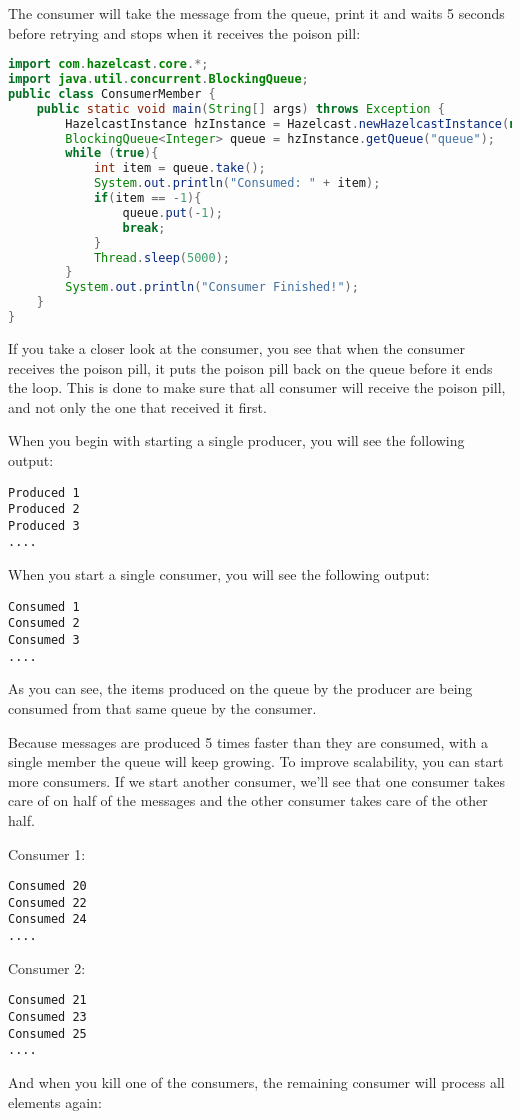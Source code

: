The consumer will take the message from the queue, print it and waits 5 seconds before retrying and stops when it receives the poison pill:
\begin{lstlisting}[language=java]
import com.hazelcast.core.*;
import java.util.concurrent.BlockingQueue;
public class ConsumerMember {
    public static void main(String[] args) throws Exception {
        HazelcastInstance hzInstance = Hazelcast.newHazelcastInstance(null);
        BlockingQueue<Integer> queue = hzInstance.getQueue("queue");
        while (true){
            int item = queue.take();
            System.out.println("Consumed: " + item);
            if(item == -1){
                queue.put(-1);
                break;
            }     
            Thread.sleep(5000);            
        }
        System.out.println("Consumer Finished!");
    }
}
\end{lstlisting}
If you take a closer look at the consumer, you see that when the consumer receives the poison pill, it puts the poison pill back on the queue before it ends the loop. This is done to make sure that all consumer will receive the poison pill, and not only the one that received it first.

When you begin with starting a single producer, you will see the following output:
\begin{verbatim}
Produced 1
Produced 2
Produced 3
....
\end{verbatim}
When you start a single consumer, you will see the following output:
\begin{verbatim}
Consumed 1
Consumed 2
Consumed 3
....
\end{verbatim}
As you can see, the items produced on the queue by the producer are being consumed from that same queue by the consumer. 

Because messages are produced 5 times faster than they are consumed, with a single member the queue will keep growing. To improve scalability, you can start more consumers. If we start another consumer, we'll see that one consumer takes care of on half of the messages and the other consumer takes care of the other half.

Consumer 1:
\begin{verbatim}
Consumed 20
Consumed 22
Consumed 24
....
\end{verbatim}
Consumer 2:
\begin{verbatim}
Consumed 21
Consumed 23
Consumed 25
....
\end{verbatim}
And when you kill one of the consumers, the remaining consumer will process all elements again:

